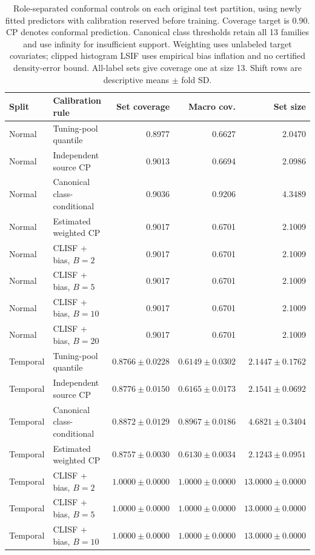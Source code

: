 \begin{table}[htbp]
\centering\scriptsize
\setlength{\tabcolsep}{2.3pt}
\caption{Role-separated conformal controls on each original test partition, using newly fitted predictors with calibration reserved before training. Coverage target is 0.90. CP denotes conformal prediction. Canonical class thresholds retain all 13 families and use infinity for insufficient support. Weighting uses unlabeled target covariates; clipped histogram LSIF uses empirical bias inflation and no certified density-error bound. All-label sets give coverage one at size 13. Shift rows are descriptive means $\pm$ fold SD.}\label{tab:supp-independent-conformal}
\begin{tabular}{llrrr}
\toprule
Split & Calibration rule & Set coverage & Macro cov. & Set size \\
\midrule
Normal & Tuning-pool quantile & 0.8977 & 0.6627 & 2.0470 \\
Normal & Independent source CP & 0.9013 & 0.6694 & 2.0986 \\
Normal & Canonical class-conditional & 0.9036 & 0.9206 & 4.3489 \\
Normal & Estimated weighted CP & 0.9017 & 0.6701 & 2.1009 \\
Normal & CLISF + bias, $B=2$ & 0.9017 & 0.6701 & 2.1009 \\
Normal & CLISF + bias, $B=5$ & 0.9017 & 0.6701 & 2.1009 \\
Normal & CLISF + bias, $B=10$ & 0.9017 & 0.6701 & 2.1009 \\
Normal & CLISF + bias, $B=20$ & 0.9017 & 0.6701 & 2.1009 \\
Temporal & Tuning-pool quantile & $0.8766\pm0.0228$ & $0.6149\pm0.0302$ & $2.1447\pm0.1762$ \\
Temporal & Independent source CP & $0.8776\pm0.0150$ & $0.6165\pm0.0173$ & $2.1541\pm0.0692$ \\
Temporal & Canonical class-conditional & $0.8872\pm0.0129$ & $0.8967\pm0.0186$ & $4.6821\pm0.3404$ \\
Temporal & Estimated weighted CP & $0.8757\pm0.0030$ & $0.6130\pm0.0034$ & $2.1243\pm0.0951$ \\
Temporal & CLISF + bias, $B=2$ & $1.0000\pm0.0000$ & $1.0000\pm0.0000$ & $13.0000\pm0.0000$ \\
Temporal & CLISF + bias, $B=5$ & $1.0000\pm0.0000$ & $1.0000\pm0.0000$ & $13.0000\pm0.0000$ \\
Temporal & CLISF + bias, $B=10$ & $1.0000\pm0.0000$ & $1.0000\pm0.0000$ & $13.0000\pm0.0000$ \\

\end{tabular}
\end{table}
